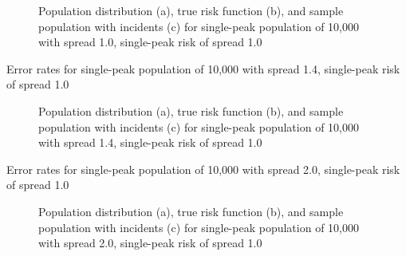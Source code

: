 {\begin{figure}[H]
    
    \caption[]{Population distribution (a), true risk function (b), and sample population with incidents (c) for single-peak population of 10,000 with \gls{spread} 1.0, single-peak risk of \gls{spread} 1.0}
    \label{fig:distributions:p1.0_100_1.0_1h}    
\end{figure} \newpage


\begin{table}[H]
    
    \caption[]{Error rates for single-peak population of 10,000 with \gls{spread} 1.4, single-peak risk of \gls{spread} 1.0}
    \label{tab:mean_error_rates:p1.4_100_1.0_1h}
\end{table}

\begin{figure}[H]
    
    \caption[]{Population distribution (a), true risk function (b), and sample population with incidents (c) for single-peak population of 10,000 with \gls{spread} 1.4, single-peak risk of \gls{spread} 1.0}
    \label{fig:distributions:p1.4_100_1.0_1h}    
\end{figure} \newpage


\begin{table}[H]
    
    \caption[]{Error rates for single-peak population of 10,000 with \gls{spread} 2.0, single-peak risk of \gls{spread} 1.0}
    \label{tab:mean_error_rates:p2.0_100_1.0_1h}
\end{table}

\begin{figure}[H]
    
    \caption[]{Population distribution (a), true risk function (b), and sample population with incidents (c) for single-peak population of 10,000 with \gls{spread} 2.0, single-peak risk of \gls{spread} 1.0}
    \label{fig:distributions:p2.0_100_1.0_1h}    
\end{figure} \newpage


}
